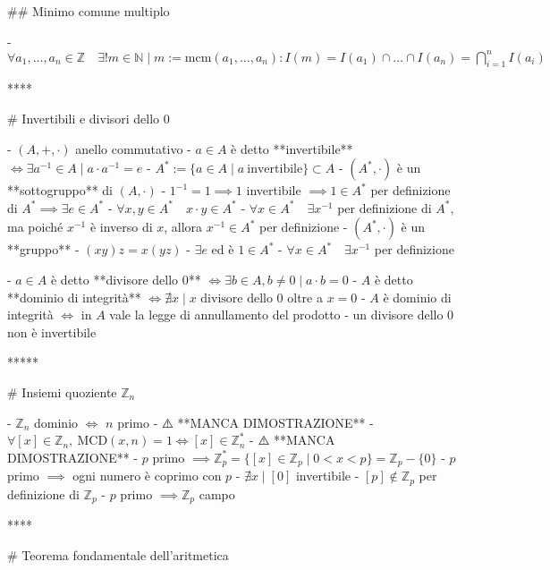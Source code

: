 ## Minimo comune multiplo

- $\displaystyle{\forall a_{1}, \ldots, a_{n} \in \mathbb{Z}  \quad \exists ! m  \in \mathbb{N} \mid m:= \textrm{mcm}(a_1, \ldots, a_n) : I(m) = I(a_1) \cap \ldots \cap I(a_n) = \bigcap_{i=1}^{n}{I(a_i)}}$

****

# Invertibili e divisori dello $0$

- $(A, +, \cdot)$ anello commutativo
  - $a \in A$ è detto **invertibile** \( \iff \exists a^{-1} \in A \mid a \cdot a^{-1}=e \)
    - $A^* := \{a \in A \mid a \ \textrm{invertibile}\} \subset A$
    - $(A^*, \cdot)$ è un **sottogruppo** di $(A, \cdot)$
      - $1^{-1} = 1 \implies 1$ invertibile $\implies 1 \in A^*$ per definizione di $A^* \implies \exists e \in A^*$
      - \( \forall x, y \in A^{*} \quad x \cdot y \in A^{*} \)
      - \( \forall x \in A^{*} \quad \exists x^{-1} \) per definizione di $A^*$, ma poiché $x^{-1}$ è inverso di $x$, allora $x^{-1} \in A^*$ per definizione
    - $(A^*, \cdot)$ è un **gruppo**
      - $(xy)z = x(yz)$
      - $\exists e$ ed è $1 \in A^*$
      - \( \forall x \in A^{*} \quad \exists x^{-1}\) per definizione

  - $a \in A$ è detto **divisore dello $0$** \( \iff \exists b \in A, b \neq 0 \mid a \cdot b=0 \)
    - $A$ è detto **dominio di integrità** $\iff \nexists x \mid x \textrm{  divisore dello 0}$ oltre a $x = 0$
    - $A$ è dominio di integrità $\iff$ in $A$ vale la legge di annullamento del prodotto
      - un divisore dello $0$ non è invertibile

*****

# Insiemi quoziente $\mathbb{Z}_n$

- $\mathbb{Z}_n$ dominio $\iff$ $n$ primo
      - ⚠️ **MANCA DIMOSTRAZIONE**
- $\forall [x] \in \mathbb{Z}_n, \ \textrm{MCD}(x, n) = 1 \iff [x] \in \mathbb{Z}^*_n$
      - ⚠️ **MANCA DIMOSTRAZIONE**
    - $p$ primo $\implies \mathbb{Z}_p^* = \{[x] \in \mathbb{Z}_p \mid  0 \lt x \lt p\} = \mathbb{Z}_p - \{0\}$
        - $p$ primo $\implies$ ogni numero è coprimo con $p$
        - $\nexists x \mid [0]$ invertibile
        - $[p] \notin \mathbb{Z}_p$ per definizione di $\mathbb{Z}_p$
        - $p$ primo $\implies \mathbb{Z}_p$ campo

****

# Teorema fondamentale dell'aritmetica

